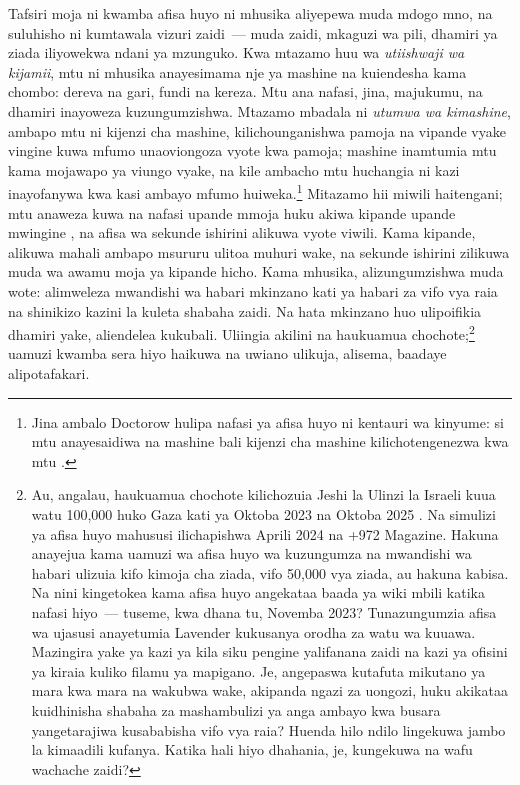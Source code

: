 Tafsiri moja ni kwamba afisa huyo ni mhusika aliyepewa muda mdogo mno, na suluhisho ni kumtawala vizuri zaidi~— muda zaidi, mkaguzi wa pili, dhamiri ya ziada iliyowekwa ndani ya mzunguko. Kwa mtazamo huu wa \emph{utiishwaji wa kijamii}, mtu ni mhusika anayesimama nje ya mashine na kuiendesha kama chombo: dereva na gari, fundi na kereza. Mtu ana nafasi, jina, majukumu, na dhamiri inayoweza kuzungumzishwa. Mtazamo mbadala ni \emph{utumwa wa kimashine}, ambapo mtu ni kijenzi cha mashine, kilichounganishwa pamoja na vipande vyake vingine kuwa mfumo unaoviongoza vyote kwa pamoja; mashine inamtumia mtu kama mojawapo ya viungo vyake, na kile ambacho mtu huchangia ni kazi inayofanywa kwa kasi ambayo mfumo huiweka.\footnote{Jina ambalo Doctorow hulipa nafasi ya afisa huyo ni kentauri wa kinyume: si mtu anayesaidiwa na mashine bali kijenzi cha mashine kilichotengenezwa kwa mtu \autocite{doctorow2026reversecentaur}.} Mitazamo hii miwili haitengani; mtu anaweza kuwa na nafasi upande mmoja huku akiwa kipande upande mwingine \autocite[Uwanda 13, “The Apparatus of Capture”: utumwa upo pale binadamu wenyewe wanapokuwa vipande vinavyounda mashine ambayo wao huiunda miongoni mwao na pamoja na vitu vingine, chini ya udhibiti na uongozi wa umoja wa juu zaidi, na utiishwaji upo pale umoja huo wa juu zaidi unapomfanya binadamu kuwa mhusika aliyefungamanishwa na kitu kipya cha nje, ambacho kinaweza kuwa mnyama, chombo, au hata mashine]{deleuze1987plateaus}, na afisa wa sekunde ishirini alikuwa vyote viwili. Kama kipande, alikuwa mahali ambapo msururu ulitoa muhuri wake, na sekunde ishirini zilikuwa muda wa awamu moja ya kipande hicho. Kama mhusika, alizungumzishwa muda wote: alimweleza mwandishi wa habari mkinzano kati ya habari za vifo vya raia na shinikizo kazini la kuleta shabaha zaidi. Na hata mkinzano huo ulipoifikia dhamiri yake, aliendelea kukubali. Uliingia akilini na haukuamua chochote;\footnote{Au, angalau, haukuamua chochote kilichozuia Jeshi la Ulinzi la Israeli kuua watu 100,000 huko Gaza kati ya Oktoba 2023 na Oktoba 2025 \autocite{gomezugarte2025uncertainty,acosta2026gaza,economist2025gaza}. Na simulizi ya afisa huyo mahususi ilichapishwa Aprili 2024 na +972 Magazine. Hakuna anayejua kama uamuzi wa afisa huyo wa kuzungumza na mwandishi wa habari ulizuia kifo kimoja cha ziada, vifo 50,000 vya ziada, au hakuna kabisa. Na nini kingetokea kama afisa huyo angekataa baada ya wiki mbili katika nafasi hiyo~— tuseme, kwa dhana tu, Novemba 2023? Tunazungumzia afisa wa ujasusi anayetumia Lavender kukusanya orodha za watu wa kuuawa. Mazingira yake ya kazi ya kila siku pengine yalifanana zaidi na kazi ya ofisini ya kiraia kuliko filamu ya mapigano. Je, angepaswa kutafuta mikutano ya mara kwa mara na wakubwa wake, akipanda ngazi za uongozi, huku akikataa kuidhinisha shabaha za mashambulizi ya anga ambayo kwa busara yangetarajiwa kusababisha vifo vya raia? Huenda hilo ndilo lingekuwa jambo la kimaadili kufanya. Katika hali hiyo dhahania, je, kungekuwa na wafu wachache zaidi?} uamuzi kwamba sera hiyo haikuwa na uwiano ulikuja, alisema, baadaye alipotafakari.

